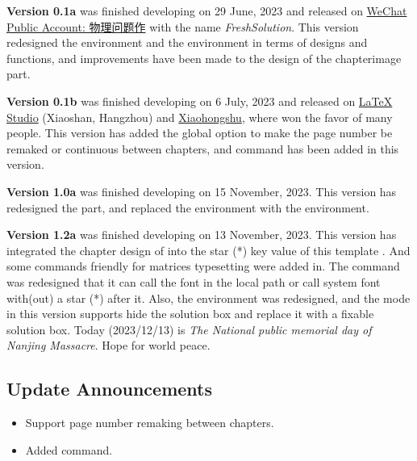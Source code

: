 \textsf{\bfseries Version 0.1a} was finished developing on 29 June, 2023 and released on \href{https://mp.weixin.qq.com/s/kd4StYk3XybhNQZkAfoY6A}{ WeChat Public Account: 物理问题作} with the name \emph{FreshSolution}. This version redesigned the  environment and the  environment in terms of designs and functions, and improvements have been made to the design of the chapterimage part.

\textsf{\bfseries Version 0.1b} was finished developing on 6 July, 2023 and released on \href{https://www.latexstudio.net/index/details/index/mid/3553.html}{LaTeX Studio} (Xiaoshan, Hangzhou) and \href{http://xhslink.com/YBuuuw}{Xiaohongshu}, where won the favor of many people. This version has added the global option to make the page number be remaked or continuous between chapters, and command  has been added in this version.

\textsf{\bfseries Version 1.0a} was finished developing on 15 November, 2023. This version has redesigned the  part,  and replaced the  environment with the  environment.

\textsf{\bfseries Version 1.2a} was finished developing on \textcolor{H1}{13 November, 2023}. This version has integrated the chapter design of \href{https://www.ctan.org/pkg/elegantbook}{} into the star (*) key value of this template . And some commands friendly for matrices typesetting were added in. The command  was redesigned that it can call the font in the local path or call system font with(out) a star (*) after it. Also, the environment  was redesigned, and the mode  in this version supports hide the solution box and replace it with a fixable solution box. Today (\textcolor{H1}{2023/12/13}) is \emph{The National public memorial day of Nanjing Massacre}. Hope for world peace.

\newpage
\subsection*{Update Announcements}
\begin{itemize}
    \item Support page number remaking between chapters.
    \item Added  command.
\end{itemize}


